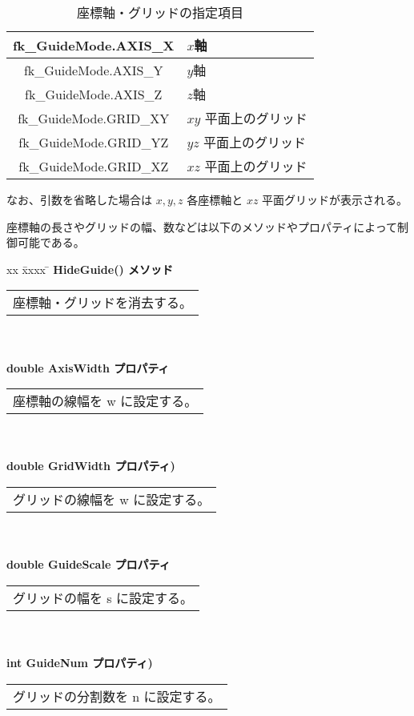 \begin{table}[H]
\caption{座標軸・グリッドの指定項目}
\label{tbl:fkAxisGrid}
\begin{center}
\begin{tabular}{|c|l|}
\hline
fk\_GuideMode.AXIS\_X & \(x\)軸 \\ \hline
fk\_GuideMode.AXIS\_Y & \(y\)軸 \\ \hline
fk\_GuideMode.AXIS\_Z & \(z\)軸 \\ \hline
fk\_GuideMode.GRID\_XY & \(xy\) 平面上のグリッド \\ \hline
fk\_GuideMode.GRID\_YZ & \(yz\) 平面上のグリッド \\ \hline
fk\_GuideMode.GRID\_XZ & \(xz\) 平面上のグリッド \\ \hline
\end{tabular}
\end{center}
\end{table}

なお、引数を省略した場合は \(x,y,z\) 各座標軸と \(xz\) 平面グリッドが表示される。

座標軸の長さやグリッドの幅、数などは以下のメソッドやプロパティによって制御可能である。

\begin{tabbing}
xx \= xxxx \= \kill
\> \textbf{HideGuide() メソッド} \\
	\> \> \begin{tabular}{p{15cm}}
		座標軸・グリッドを消去する。
	\end{tabular} \\ \\

\> \textbf{double AxisWidth プロパティ} \\
	\> \> \begin{tabular}{p{15cm}}
		座標軸の線幅を w に設定する。
	\end{tabular} \\ \\

\> \textbf{double GridWidth プロパティ)} \\
	\> \> \begin{tabular}{p{15cm}}
		グリッドの線幅を w に設定する。
	\end{tabular} \\ \\

\> \textbf{double GuideScale プロパティ} \\
	\> \> \begin{tabular}{p{15cm}}
		グリッドの幅を s に設定する。
	\end{tabular} \\ \\

\> \textbf{int GuideNum プロパティ)} \\
	\> \> \begin{tabular}{p{15cm}}
		グリッドの分割数を n に設定する。
	\end{tabular}
\end{tabbing}
